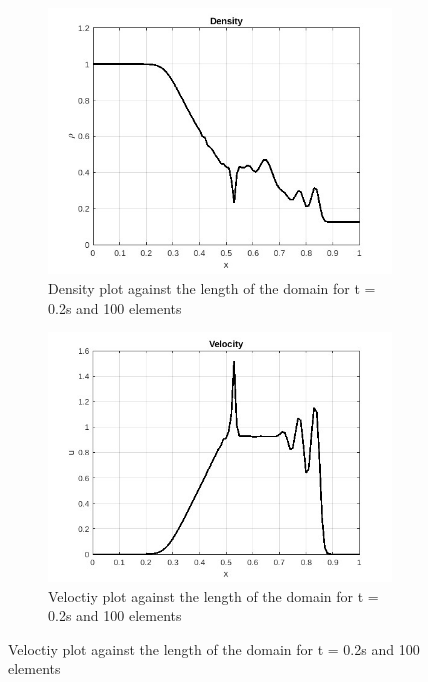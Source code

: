 \documentclass[12pt, oneside]{article}
\begin{document}
\begin{figure}[!h]
    \captionsetup[subfigure]{justification=centering}
    \centering
    \begin{subfigure}[!h]{0.45\textwidth}
	\includegraphics[width=\textwidth]{1d_euler_rho_tg.jpg}
	\caption{Density plot against the length of the domain for t = 0.2s and 100 elements}
	\label{fig-rho-tg}
    \end{subfigure}
    \hfill
    \begin{subfigure}[!h]{0.45\textwidth}
	\includegraphics[width=\textwidth]{1d_euler_vel_tg.jpg}
	\caption{Veloctiy plot against the length of the domain for t = 0.2s and 100 elements}
	\label{fig-vel-tg}
    \end{subfigure}

\end{figure}
\end{document}
